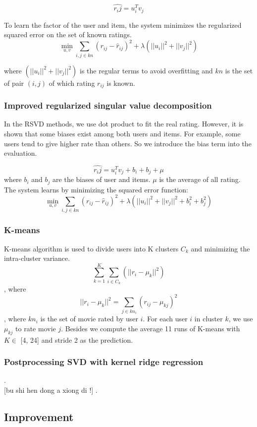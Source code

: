 \documentclass[10pt,conference,compsocconf]{IEEEtran}
\begin{document}
$$ \hat{r_ij}=u_{i}^{T}v_{j} $$

To learn the factor of the user and item, the system minimizes the regularized squared error on the set of known ratings.
$$  \min \limits_{u, v} \sum_{i, j\in kn} (r_{ij} - \hat r_{ij})^2 + \lambda (||u_i||^2 + ||v_j||^2)  $$

where $ (||u_i||^2 + ||v_j||^2)$ is the regular terms to avoid overfitting and $kn$ is the set of pair $(i, j)$ of which rating $r_{ij}$ is known.

\subsubsection{Improved regularized singular value decomposition}
In the RSVD methods, we use dot product to fit the real rating. However, it is shown that some biases exist among both users and items. For example, some users tend to give higher rate than others. So we introduce the bias term into the evaluation.

$$ \hat{r_ij}=u_{i}^{T}v_{j} + b_i + b_j  + \mu $$
where $b_i$ and $b_j$ are the biases of user and items. $\mu$ is the average of all rating. The system learns by minimizing the squared error function:
$$  \min \limits_{u, v} \sum_{i, j\in kn} (r_{ij} - \hat r_{ij})^2 + \lambda (||u_i||^2 + ||v_j||^2 + b_i^2 + b_j^2)  $$

\subsubsection{K-means}
 K-means algorithm is used to divide users into K clusters $C_k$ and minimizing the intra-cluster variance.
 $$   \sum_{k=1}^K \sum_{i \in C_k} (||r_{i}-\mu_k||^2)  $$, where $$  ||r_{i}-\mu_k||^2 = \sum_{j \in kn_i}(r_{ij}-\mu_{kj})^2  $$, where $kn_i$ is the set of movie rated by user $i$. 
 For each user $i$ in cluster $k$, we use $\mu_{kj}$ to rate movie $j$. Besides we compute the average 11 runs of K-means with $K\in$ [4, 24] and stride 2 as the prediction.

\subsubsection{Postprocessing SVD with kernel ridge regression}
.  \\

[bu shi hen dong a xiong di !]
. \\



\subsection{Improvement}
\end{document}
